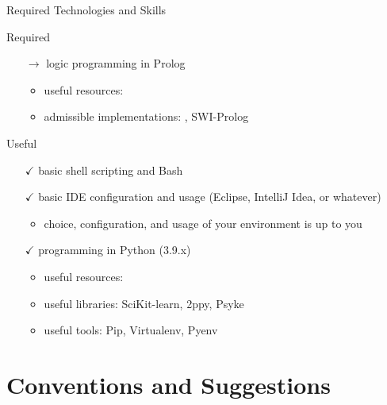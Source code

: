 \documentclass[presentation]{beamer}\mode<presentation>{\usetheme{AMSBolognaFC}}
\begin{document}
\begin{frame}[c,allowframebreaks]{Required Technologies and Skills}
\begin{alertblock}{Required}
\begin{itemize}
		\item[$\rightarrow$] logic programming in Prolog
		\begin{itemize}
			\item useful resources: 
			\item admissible implementations: \alert{\twopkt{}}, SWI-Prolog
		\end{itemize}

	\end{itemize}
\end{alertblock}

\begin{exampleblock}{Useful}
	\begin{itemize}
		\item[$\checkmark$] basic shell scripting and \alert{Bash}
		\item[$\checkmark$] basic IDE configuration and usage (\alert{Eclipse}, \alert{IntelliJ Idea}, or whatever)
		\begin{itemize}
			\item choice, configuration, and usage of your environment is up to you
		\end{itemize} 
		\item[$\checkmark$] programming in Python (3.9.x)
		\begin{itemize}
			\item useful resources: 
			\item useful libraries: SciKit-learn, 2ppy, Psyke
			\item useful tools: Pip, Virtualenv, Pyenv
		\end{itemize}
	\end{itemize}
\end{exampleblock}

\end{frame}

\section{Conventions and Suggestions}
\end{document}
